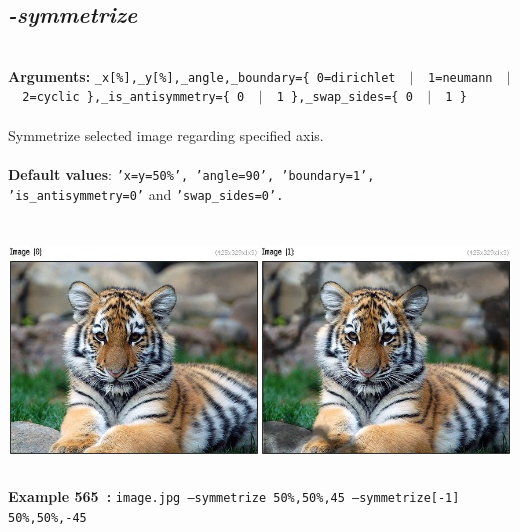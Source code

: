\documentclass[a4paper,11pt,twoside]{book}
\begin{document}
\subsection{\emph{-symmetrize} }\vspace*{-0.5em}
~\\\textbf{Arguments: } 
{\small \texttt{\_x[\%],\_y[\%],\_angle,\_boundary=\{ 0=dirichlet ~$|$~ 1=neumann ~$|$~ 2=cyclic \},\_is\_antisymmetry=\{ 0 ~$|$~ 1 \},\_swap\_sides=\{ 0 ~$|$~ 1 \}}}\\~\\
Symmetrize selected image regarding specified axis.
~\\~\\\textbf{Default values}: {\small \texttt{'x=y=50\%', 'angle=90', 'boundary=1', 'is\_antisymmetry=0'} and \texttt{'swap\_sides=0'.}}
\begin{center}\includegraphics[keepaspectratio=true,height=7cm,width=\textwidth]{img/gmic_def565.jpg}\\
{\footnotesize \textbf{Example 565~:} \texttt{image.jpg --symmetrize 50\%,50\%,45 --symmetrize[-1] 50\%,50\%,-45}}
\end{center}
\end{document}
